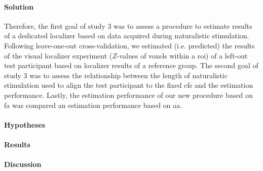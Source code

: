 \paragraph{Solution}
%
Therefore, the first goal of study 3 was to assess a procedure to estimate
results of a dedicated localizer \citep{sengupta2016extension} based on data
acquired during naturalistic stimulation.
%
Following leave-one-out cross-validation, we estimated (i.e. predicted) the
results of the visual localizer experiment ($Z$-values of voxels within a
\ac{roi}) of a left-out test participant based on localizer results of a
reference group.
The second goal of study 3 was to assess the relationship between the length of
naturalistic stimulation used to align the test participant to the fixed
\ac{cfs} and the estimation performance.
%
Lastly, the estimation performance of our new procedure based on \ac{fa} was
compared an estimation performance based on \ac{aa}.


\paragraph{Hypotheses}


\paragraph{Results}


\paragraph{Discussion}
